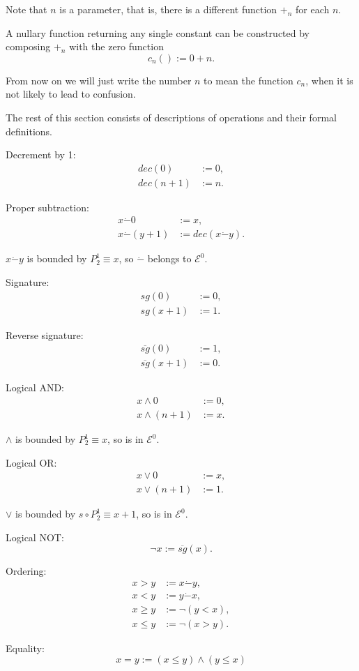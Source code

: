 \documentclass[a4paper]{article}
\newcommand{\grz}[1]{$\mathcal{E}^{#1}$}	%
\newcommand{\psub}{\dot -}	%
\newcommand{\rsg}{\overline{sg}} %
\newcommand{\recur}[1]{\begin{equation} \begin{split} #1 \end{split} \end{equation}}	%
\theoremstyle{plain}
\theoremstyle{definition}
\begin{document}
Note that $n$ is a parameter, that is, there is a different function $+_n$ for each $n$.

A nullary function returning any single constant can be constructed by composing $+_n$ with the zero function 
\begin{equation} c_n() := 0 + n. \end{equation}

From now on we will just write the number $n$ to mean the function $c_n$, when it is not likely to lead to confusion.

The rest of this section consists of descriptions of operations and their formal definitions.

Decrement by 1:
\recur{
	dec(0) &:= 0, \\
	dec(n+1) &:= n.
}

Proper subtraction:
\recur{
	x \psub 0 &:= x, \\
	x \psub (y+1) &:= dec(x \psub y).
}

$x \psub y$ is bounded by $P_2^1 \equiv x$, so $\psub$ belongs to \grz{0}.

Signature:
\recur{
	sg(0) &:= 0, 	\\
	sg(x+1) &:= 1.
}

Reverse signature:
\recur{
	\rsg(0) &:= 1, \\
	\rsg(x+1) &:= 0.
}

Logical AND:
\recur{
	x \wedge 0 &:= 0,	 \\
	x \wedge (n+1) &:= x.
}

$\wedge$ is bounded by $P_2^1 \equiv x$, so is in \grz{0}.

Logical OR:
\recur{
	x \vee 0 &:= x, 		\\
	x \vee (n+1) &:= 1.
}

$\vee$ is bounded by $s \circ P_2^1 \equiv x+1$, so is in \grz{0}.

Logical NOT:
\begin{equation} \neg x := \rsg(x). \end{equation}

Ordering:
\begin{equation} \begin{split} 
	x > y &:= x \psub y, 	\\
	x < y &:= y \psub x, \\
	x \geq y &:= \neg (y<x),	\\
	x \leq y &:= \neg (x>y).
\end{split} \end{equation}

Equality:
\begin{equation} x=y := (x \leq y) \wedge (y \leq x) \end{equation}
\end{document}
